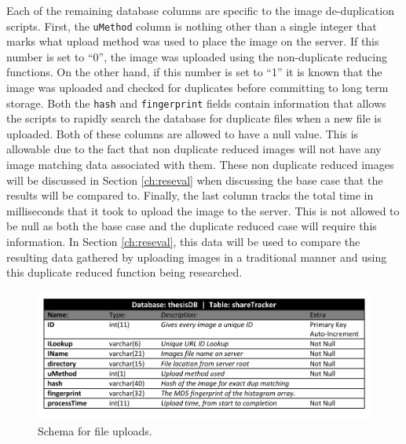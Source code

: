 Each of the remaining database columns are specific to the image de-duplication scripts. First, the {\tt uMethod} column is nothing other than a single integer that marks what upload method was used to place the image on the server. If this number is set to ``0'', the image was uploaded using the non-duplicate reducing functions. On the other hand, if this number is set to ``1'' it is known that the image was uploaded and checked for duplicates before committing to long term storage. Both the {\tt hash} and {\tt fingerprint} fields contain information that allows the scripts to rapidly search the database for duplicate files when a new file is uploaded.  Both of these columns are allowed to have a null value. This is allowable due to the fact that non duplicate reduced images will not have any image matching data associated with them. These non duplicate reduced images will be discussed in Section \ref{ch:reseval} when discussing the base case that the results will be compared to. Finally, the last column tracks the total time in milliseconds that it took to upload the image to the server. This is not allowed to be null as both the base case and the duplicate reduced case will require this information. In Section \ref{ch:reseval}, this data will be used to compare the resulting data gathered by uploading images in a traditional manner and using this duplicate reduced function being researched.

\begin{figure}[htbp]
\centering
\includegraphics[width=6in]{schema}
\caption{Schema for file uploads.}
\label{fig:schema}
\end{figure}

